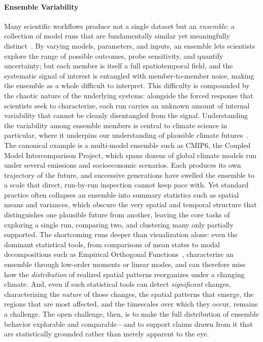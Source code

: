 \paragraph{Ensemble Variability}
%
Many scientific workflows produce not a single dataset but an \textit{ensemble}: a collection of model runs that are fundamentally similar yet meaningfully distinct~\cite{wang_visualization_2019, kehrer_visualization_2013}.
%
By varying models, parameters, and inputs, an ensemble lets scientists explore the range of possible outcomes, probe sensitivity, and quantify uncertainty; but each member is itself a full spatiotemporal field, and the systematic signal of interest is entangled with member-to-member noise, making the ensemble as a whole difficult to interpret.
%
This difficulty is compounded by the chaotic nature of the underlying systems: alongside the forced response that scientists seek to characterize, each run carries an unknown amount of internal variability that cannot be cleanly disentangled from the signal.
%
Understanding the variability among ensemble members is central to climate science in particular, where it underpins our understanding of plausible climate futures~\cite{eyring2016overview}.
%
The canonical example is a multi-model ensemble such as CMIP6, the Coupled Model Intercomparison Project, which spans dozens of global climate models run under several emissions and socioeconomic scenarios. 
%
Each produces its own trajectory of the future, and successive generations have swelled the ensemble to a scale that direct, run-by-run inspection cannot keep pace with.
%
Yet standard practice often collapses an ensemble into summary statistics such as spatial means and variances, which obscure the very spatial and temporal structure that distinguishes one plausible future from another, leaving the core tasks of exploring a single run, comparing two, and clustering many only partially supported.
%
The shortcoming runs deeper than visualization alone: even the dominant statistical tools, from comparisons of mean states to modal decompositions such as Empirical Orthogonal Functions~\cite{hannachi2007empirical}, characterize an ensemble through low-order moments or linear modes, and can therefore miss how the \emph{distribution} of realized spatial patterns reorganizes under a changing climate.
%
And, even if such statistical tools can detect \emph{significant} changes, characterizing the \emph{nature} of those changes, the spatial patterns that emerge, the regions that are most affected, and the timescales over which they occur, remains a challenge.
%
The open challenge, then, is to make the full distribution of ensemble behavior explorable and comparable---and to support claims drawn from it that are statistically grounded rather than merely apparent to the eye.

